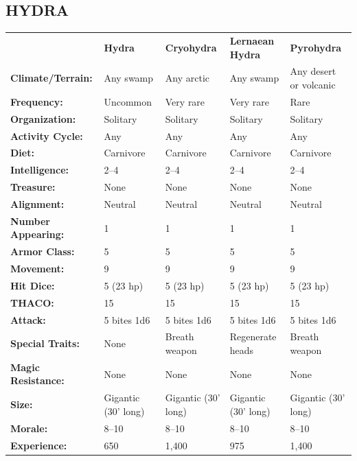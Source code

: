 \noindent
\begin{minipage}{\columnwidth}

\vspace{1em}

\subsection{HYDRA}

\noindent \begin{tabular}{p{}g{.17\columnwidth}p{.17\columnwidth}g{.17\columnwidth}p{.17\columnwidth}}
	& \textbf{Hydra}	& \textbf{Cryohydra}	& \textbf{Lernaean Hydra}	& \textbf{Pyrohydra}	\\
\textbf{Climate/Terrain:}	& Any swamp	& Any arctic	& Any swamp	& Any desert or volcanic	\\
\textbf{Frequency:} 		& Uncommon	& Very rare	& Very rare	& Rare	\\
\textbf{Organization:} 		& Solitary	& Solitary	& Solitary	& Solitary	\\
\textbf{Activity Cycle:} 	& Any	& Any	& Any	& Any	\\
\textbf{Diet:} 				& Carnivore	& Carnivore	& Carnivore	& Carnivore	\\
\textbf{Intelligence:} 		& 2--4	& 2--4	& 2--4	& 2--4	\\
\textbf{Treasure:} 			& None	& None	& None	& None	\\
\textbf{Alignment:} 		& Neutral	& Neutral	& Neutral	& Neutral	\\
\hline
\textbf{Number Appearing:} 	& 1	& 1	& 1	& 1	\\
\textbf{Armor Class:} 		& 5	& 5	& 5	& 5	\\
\textbf{Movement:} 			& 9	& 9	& 9	& 9	\\
\textbf{Hit Dice:} 			& 5 (23 hp)	& 5 (23 hp)	& 5 (23 hp)	& 5 (23 hp)	\\
\textbf{THACO:} 			& 15	& 15	& 15	& 15	\\
\textbf{Attack:} 			& 5 bites 1d6	& 5 bites 1d6	& 5 bites 1d6	& 5 bites 1d6	\\
\textbf{Special Traits:} & None	& Breath weapon	& Regenerate heads	& Breath weapon	\\
\textbf{Magic Resistance:} 	& None	& None	& None	& None	\\
\textbf{Size:} 				& Gigantic (30' long)	& Gigantic (30' long)	& Gigantic (30' long)	& Gigantic (30' long)	\\
\textbf{Morale:} 			& 8--10	& 8--10	& 8--10	& 8--10	\\
\textbf{Experience:} 		& 650	& 1,400	& 975	& 1,400	\\ %
\end{tabular}

\end{minipage}

